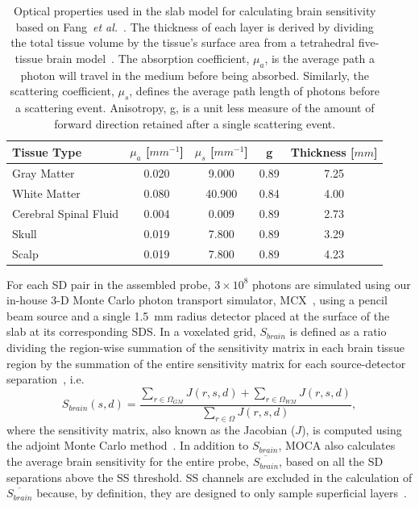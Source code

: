 \begin{table}
\centering
\caption{Optical properties used in the slab model for calculating brain sensitivity based on Fang~\emph{et al.}~\cite{Fang2010}. The thickness of each layer is derived by dividing the total tissue volume by the tissue's surface area from a tetrahedral five-tissue brain model~\cite{Sanchez2012}. The absorption coefficient, $\mu_{a}$, is the average path a photon will travel in the medium before being absorbed. Similarly, the scattering coefficient, $\mu_{s}$, defines the average path length of photons before a scattering event. Anisotropy, g, is a unit less measure of the amount of forward direction retained after a single scattering event.}
\label{tab:opticalproperties}
\begin{tabular}{@{}lcccc@{}}
\toprule
Tissue Type  & $\mu_{a}$ [$mm^{-1}$] & $\mu_{s}$ [$mm^{-1}$] & g    & Thickness [$mm$] \\ \midrule
Gray Matter                     & 0.020      & 9.000      & 0.89 & 7.25           \\
White Matter                    & 0.080      & 40.900     & 0.84 & 4.00           \\
Cerebral Spinal Fluid           & 0.004      & 0.009      & 0.89 & 2.73           \\
Skull                           & 0.019      & 7.800      & 0.89 & 3.29           \\
Scalp                           & 0.019      & 7.800      & 0.89 & 4.23           \\ \bottomrule
\end{tabular}
\end{table}

For each \ac{SD} pair in the assembled probe, $3\times10^{8}$ photons are simulated using our in-house 3-D Monte Carlo photon transport simulator, MCX~\cite{Fang2009}, using a pencil beam source and a single 1.5~mm radius detector placed at the surface of the slab at its corresponding \ac{SDS}. In a voxelated grid, $S_{brain}$ is defined as a ratio dividing the region-wise summation of the sensitivity matrix in each brain tissue region by the summation of the entire sensitivity matrix for each source-detector separation~\cite{Brigadoi2015}, i.e.
\begin{equation}
\label{eq:fov}
S_{brain}(s,d) = \frac{\sum_{r\in\Omega_{GM}}J(r,s,d) + \sum_{r\in\Omega_{WM}}J(r,s,d)} {\sum_{r\in\Omega}J(r,s,d)},
\end{equation}
where the sensitivity matrix, also known as the Jacobian ($J$), is computed using the adjoint Monte Carlo method~\cite{Yao2018}. In addition to $S_{brain}$, \ac{MOCA} also calculates the average brain sensitivity for the entire probe, $\overline{S_{brain}}$, based on all the \ac{SD} separations above the SS threshold. SS channels are excluded in the calculation of $\overline{S_{brain}}$ because, by definition, they are designed to only sample superficial layers~\cite{Brigadoi2015}.

